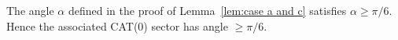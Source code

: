 \documentclass[11pt]{amsart}
\newcommand {\h}{\mathcal H}
\newcommand {\W}{\mathcal W}
\theoremstyle{definition}
\begin{document}
The angle $\alpha$ defined in the proof of Lemma~\ref{lem:case a and c} satisfies $\alpha\ge \pi/6$. Hence the associated CAT(0) sector has angle $\ge \pi/6$.




\end{document}
